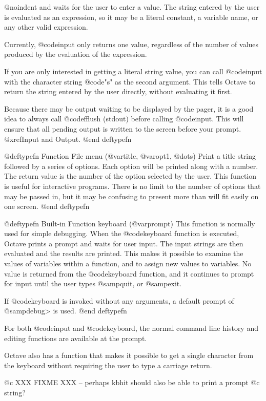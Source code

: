 @noindent
and waits for the user to enter a value.  The string entered by the user
is evaluated as an expression, so it may be a literal constant, a
variable name, or any other valid expression.

Currently, @code{input} only returns one value, regardless of the number
of values produced by the evaluation of the expression.

If you are only interested in getting a literal string value, you can
call @code{input} with the character string @code{"s"} as the second
argument.  This tells Octave to return the string entered by the user
directly, without evaluating it first.

Because there may be output waiting to be displayed by the pager, it is
a good idea to always call @code{fflush (stdout)} before calling
@code{input}.  This will ensure that all pending output is written to
the screen before your prompt.  @xref{Input and Output}.
@end deftypefn

@deftypefn {Function File} {} menu (@var{title}, @var{opt1}, @dots{})
Print a title string followed by a series of options.  Each option will
be printed along with a number.  The return value is the number of the
option selected by the user.  This function is useful for interactive
programs.  There is no limit to the number of options that may be passed
in, but it may be confusing to present more than will fit easily on one
screen.
@end deftypefn

@deftypefn {Built-in Function} {} keyboard (@var{prompt})
This function is normally used for simple debugging.  When the
@code{keyboard} function is executed, Octave prints a prompt and waits
for user input.  The input strings are then evaluated and the results
are printed.  This makes it possible to examine the values of variables
within a function, and to assign new values to variables.  No value is
returned from the @code{keyboard} function, and it continues to prompt
for input until the user types @samp{quit}, or @samp{exit}.

If @code{keyboard} is invoked without any arguments, a default prompt of
@samp{debug> } is used.
@end deftypefn

For both @code{input} and @code{keyboard}, the normal command line
history and editing functions are available at the prompt.

Octave also has a function that makes it possible to get a single
character from the keyboard without requiring the user to type a
carriage return.

@c XXX FIXME XXX -- perhaps kbhit should also be able to print a prompt
@c string?


